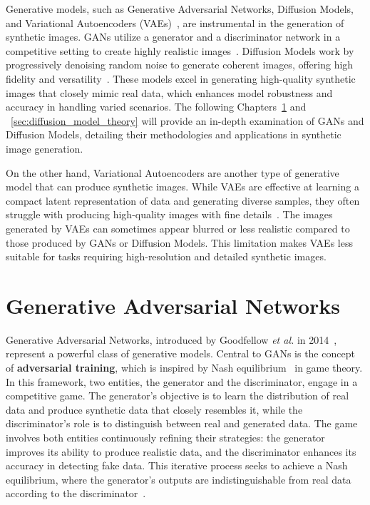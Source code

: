 \documentclass[12pt,DIV14,BCOR12mm,a4paper,footinclude=false,headinclude,parskip=half-,twoside,openright,cleardoublepage=empty,toc=index,bibliography=totoc,listof=totoc]{scrreprt}
\numberwithin{equation}{chapter}
\begin{document}
Generative models, such as Generative Adversarial Networks, Diffusion Models, and Variational Autoencoders (VAEs)~\cite{pu2016variational}, are instrumental in the generation of synthetic images. GANs utilize a generator and a discriminator network in a competitive setting to create highly realistic images~\cite{schonfeld2022improving}. Diffusion Models work by progressively denoising random noise to generate coherent images, offering high fidelity and versatility~\cite{wang2023diffusion}. These models excel in generating high-quality synthetic images that closely mimic real data, which enhances model robustness and accuracy in handling varied scenarios. The following Chapters~\ref{sec:GANs_theory} and ~\ref{sec:diffusion_model_theory} will provide an in-depth examination of GANs and Diffusion Models, detailing their methodologies and applications in synthetic image generation.

On the other hand, Variational Autoencoders are another type of generative model that can produce synthetic images. While VAEs are effective at learning a compact latent representation of data and generating diverse samples, they often struggle with producing high-quality images with fine details~\cite{cai2019multi}. The images generated by VAEs can sometimes appear blurred or less realistic compared to those produced by GANs or Diffusion Models. This limitation makes VAEs less suitable for tasks requiring high-resolution and detailed synthetic images.
\section{Generative Adversarial Networks}
\label{sec:GANs_theory}
Generative Adversarial Networks, introduced by Goodfellow \textit{et al.} in 2014~\cite{goodfellow2014generative}, represent a powerful class of generative models. Central to GANs is the concept of \textbf{adversarial training}, which is inspired by Nash equilibrium~\cite{giocoli2004nash} in game theory. In this framework, two entities, the generator and the discriminator, engage in a competitive game. The generator's objective is to learn the distribution of real data and produce synthetic data that closely resembles it, while the discriminator's role is to distinguish between real and generated data. The game involves both entities continuously refining their strategies: the generator improves its ability to produce realistic data, and the discriminator enhances its accuracy in detecting fake data. This iterative process seeks to achieve a Nash equilibrium, where the generator's outputs are indistinguishable from real data according to the discriminator~\cite{zhang2022nash}.
\end{document}
